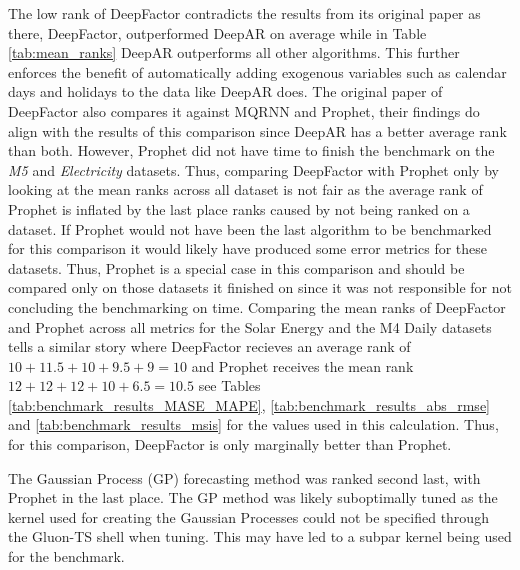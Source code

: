 The low rank of DeepFactor contradicts the results from its original paper as there, DeepFactor, outperformed DeepAR on average while in Table \ref{tab:mean_ranks} DeepAR outperforms all other algorithms. This further enforces the benefit of automatically adding exogenous variables such as calendar days and holidays to the data like DeepAR does. The original paper of DeepFactor also compares it against MQRNN and Prophet, their findings do align with the results of this comparison since DeepAR has a better average rank than both. However, Prophet did not have time to finish the benchmark on the \textit{M5} and \textit{Electricity} datasets. Thus, comparing DeepFactor with Prophet only by looking at the mean ranks across all dataset is not fair as the average rank of Prophet is inflated by the last place ranks caused by not being ranked on a dataset. If Prophet would not have been the last algorithm to be benchmarked for this comparison it would likely have produced some error metrics for these datasets. Thus, Prophet is a special case in this comparison and should be compared only on those datasets it finished on since it was not responsible for not concluding the benchmarking on time. Comparing the mean ranks of DeepFactor and Prophet across all metrics for the Solar Energy and the M4 Daily datasets tells a similar story where DeepFactor recieves an average rank of \(10+11.5+10+9.5+9=10\) and Prophet receives the mean rank \(12+12+12+10+6.5=10.5\) see Tables \ref{tab:benchmark_results_MASE_MAPE}, \ref{tab:benchmark_results_abs_rmse} and \ref{tab:benchmark_results_msis} for the values used in this calculation. Thus, for this comparison, DeepFactor is only marginally better than Prophet.

The Gaussian Process (GP) forecasting method was ranked second last, with Prophet in the last place. The GP method was likely suboptimally tuned as the kernel used for creating the Gaussian Processes could not be specified through the Gluon-TS shell when tuning. This may have led to a subpar kernel being used for the benchmark.


